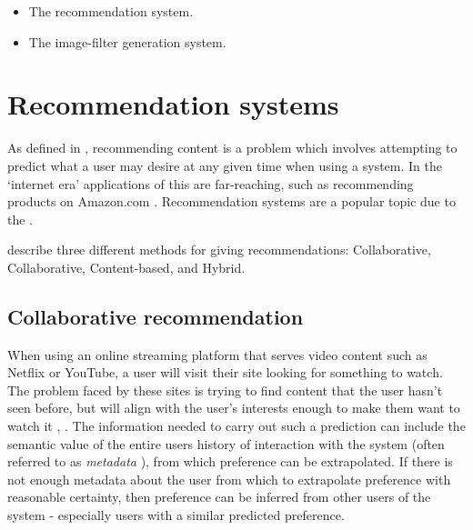 \documentclass[a4paper,12pt]{report}
\begin{document}
  \begin{itemize}
    \item The recommendation system.
    \item The image-filter generation system.
  \end{itemize}

  \section{Recommendation systems} \label{sec:lit-recc}
    As defined in \cite{ricci2011introduction}, recommending content is a problem which involves attempting to predict what a user may desire at any given time when using a system. In the ‘internet era’ applications of this are far-reaching, such as recommending products on Amazon.com \cite{linden2003amazon}. Recommendation systems are a popular topic due to the  \citep{adomavicius2005toward}.

    \cite{jannach2010recommender} describe three different methods for giving recommendations: Collaborative, Collaborative, Content-based, and Hybrid.

    \subsection{Collaborative recommendation}
      When using an online streaming platform that serves video content such as Netflix or YouTube, a user will visit their site looking for something to watch. The problem faced by these sites is trying to find content that the user hasn't seen before, but will align with the user's interests enough to make them want to watch it \citep{davidson2010youtube}, \citep{gomez2016netflix}.
      The information needed to carry out such a prediction can include the semantic value of the entire users history of interaction with the system (often referred to as \textit{metadata} \citep{duval2002metadata}), from which preference can be extrapolated. If there is not enough metadata about the user from which to extrapolate preference with reasonable certainty, then preference can be inferred from other users of the system - especially users with a similar predicted preference.
\end{document}
